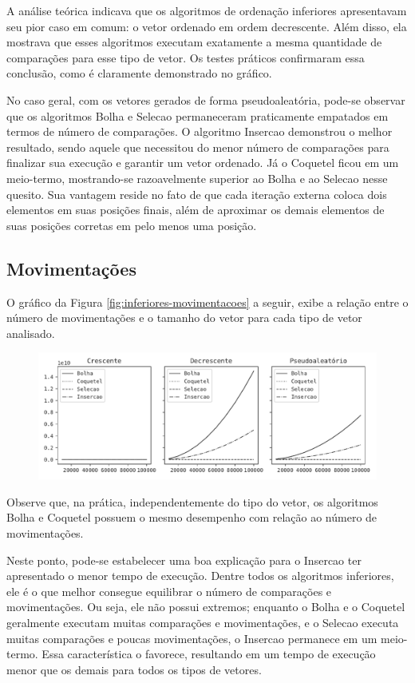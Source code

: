 A análise teórica indicava que os algoritmos de ordenação inferiores apresentavam seu pior caso em comum: o vetor ordenado em ordem decrescente. Além disso, ela mostrava que esses algoritmos executam exatamente a mesma quantidade de comparações para esse tipo de vetor. Os testes práticos confirmaram essa conclusão, como é claramente demonstrado no gráfico.

No caso geral, com os vetores gerados de forma pseudoaleatória, pode-se observar que os algoritmos Bolha e Selecao permaneceram praticamente empatados em termos de número de comparações. O algoritmo Insercao demonstrou o melhor resultado, sendo aquele que necessitou do menor número de comparações para finalizar sua execução e garantir um vetor ordenado. Já o Coquetel ficou em um meio-termo, mostrando-se razoavelmente superior ao Bolha e ao Selecao nesse quesito. Sua vantagem reside no fato de que cada iteração externa coloca dois elementos em suas posições finais, além de aproximar os demais elementos de suas posições corretas em pelo menos uma posição.

\subsection{Movimentações}
O gráfico da Figura \ref{fig:inferiores-movimentacoes} a seguir, exibe a relação entre o número de movimentações e o tamanho do vetor para cada tipo de vetor analisado.

\begin{figure}[H]
\centering
\includegraphics[scale=0.787]{figuras/pdf/inferiores.movimentacoes.pdf}
\end{figure}

Observe que, na prática, independentemente do tipo do vetor, os algoritmos Bolha e Coquetel possuem o mesmo desempenho com relação ao número de movimentações.

Neste ponto, pode-se estabelecer uma boa explicação para o Insercao ter apresentado o menor tempo de execução. Dentre todos os algoritmos inferiores, ele é o que melhor consegue equilibrar o número de comparações e movimentações. Ou seja, ele não possui extremos; enquanto o Bolha e o Coquetel geralmente executam muitas comparações e movimentações, e o Selecao executa muitas comparações e poucas movimentações, o Insercao permanece em um meio-termo. Essa característica o favorece, resultando em um tempo de execução menor que os demais para todos os tipos de vetores.

